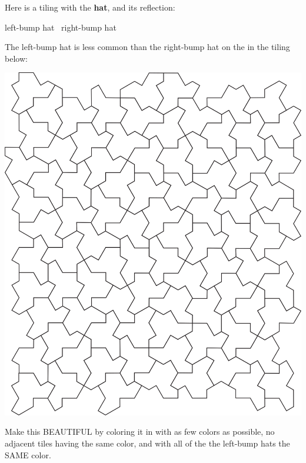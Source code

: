 \documentclass[noauthor,nooutcomes,handout,hints,12pt]{ximera}
\begin{document}
\begin{question}
  Here is a tiling with the \textbf{hat}, and its reflection:
  \begin{center}
    left-bump hat~ right-bump hat
  \end{center}
  The left-bump hat is less common than the right-bump hat on the in
  the tiling below:
  \begin{center}
    \includegraphics[scale=.8]{hat.png}
  \end{center}
  Make this BEAUTIFUL by coloring it in with as few colors as possible, no adjacent tiles having the same color, and with all of the the
  left-bump hats the SAME color.
\end{question}
\mynewpage
\end{document}
